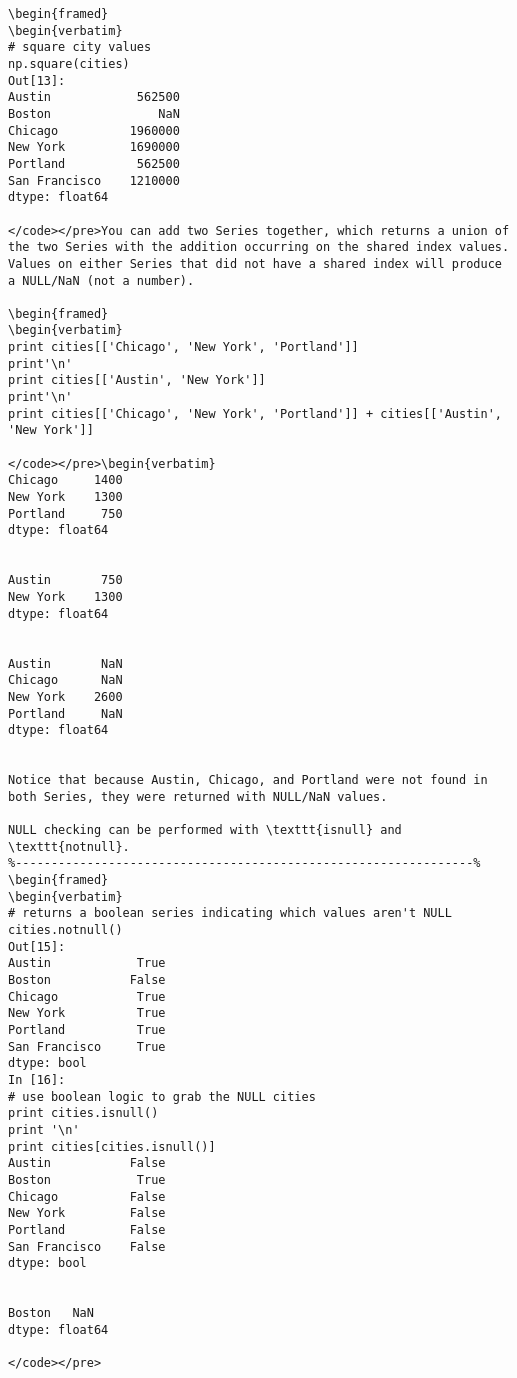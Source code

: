 \begin{itemize}
\begin{framed}
\begin{verbatim}
\begin{framed}
\begin{verbatim}
# square city values
np.square(cities)
Out[13]:
Austin            562500
Boston               NaN
Chicago          1960000
New York         1690000
Portland          562500
San Francisco    1210000
dtype: float64

</code></pre>You can add two Series together, which returns a union of the two Series with the addition occurring on the shared index values. Values on either Series that did not have a shared index will produce a NULL/NaN (not a number).

\begin{framed}
\begin{verbatim}
print cities[['Chicago', 'New York', 'Portland']]
print'\n'
print cities[['Austin', 'New York']]
print'\n'
print cities[['Chicago', 'New York', 'Portland']] + cities[['Austin', 'New York']]

</code></pre>\begin{verbatim}
Chicago     1400
New York    1300
Portland     750
dtype: float64


Austin       750
New York    1300
dtype: float64


Austin       NaN
Chicago      NaN
New York    2600
Portland     NaN
dtype: float64


Notice that because Austin, Chicago, and Portland were not found in both Series, they were returned with NULL/NaN values.

NULL checking can be performed with \texttt{isnull} and \texttt{notnull}.
%----------------------------------------------------------------%
\begin{framed}
\begin{verbatim}
# returns a boolean series indicating which values aren't NULL
cities.notnull()
Out[15]:
Austin            True
Boston           False
Chicago           True
New York          True
Portland          True
San Francisco     True
dtype: bool
In [16]:
# use boolean logic to grab the NULL cities
print cities.isnull()
print '\n'
print cities[cities.isnull()]
Austin           False
Boston            True
Chicago          False
New York         False
Portland         False
San Francisco    False
dtype: bool


Boston   NaN
dtype: float64

</code></pre>



\end{verbatim}
\end{framed}
\end{itemize}

